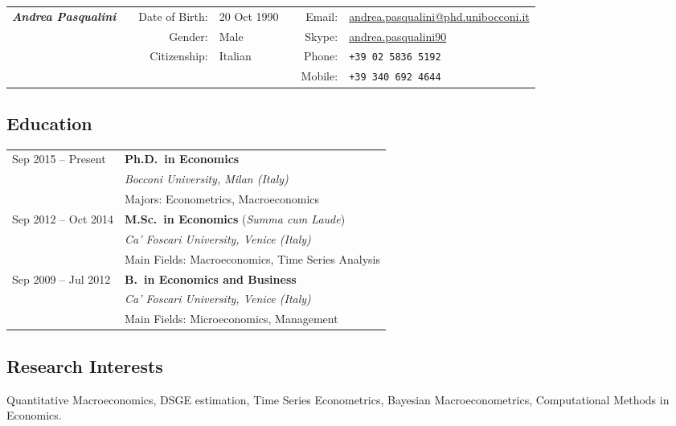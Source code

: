\documentclass[a4paper,10pt]{article}
\makeatletter
\newlength{\leftcolumn}
\newlength{\maincolumn}
\newcommand{\email}{{\href{mailto:andrea.pasqualini@phd.unibocconi.it}{andrea.pasqualini@phd.unibocconi.it}}}
\newcommand{\skype}{{\href{skype:andrea.pasqualini90}{andrea.pasqualini90}}}
\newcommand{\phone}{\tt +39~02~5836~5192}
\newcommand{\mobile}{\tt +39~340~692~4644}
\newcommand{\cafoscari}{\emph{Ca' Foscari University, Venice (Italy)}}
\newcommand{\bocconi}{\emph{Bocconi University, Milan (Italy)}}
\makeatother
\begin{document}
	{\hspace{-2cm}
		\small
		\begin{tabular}{lcrlcrl}
			\multirow{4}{*}{\LARGE\itshape\bfseries Andrea Pasqualini}
			&& Date of Birth: 	& 20 Oct 1990 	&& Email: 	& \email 	\\ 
			&& Gender: 			& Male 			&& Skype:	& \skype 	\\ 
			&& Citizenship: 	& Italian 		&& Phone: 	& \phone 	\\
			&& 					& 				&& Mobile: 	& \mobile \\ \hline
		\end{tabular}
	}

	\subsection*{Education}
		\begin{longtable}{p{\leftcolumn}p{\maincolumn}}
			Sep 2015 -- Present 	& \textbf{Ph.D.~in Economics} \\
									& \bocconi \\
									& Majors: Econometrics, Macroeconomics \vspace{1em}\\
			Sep 2012 -- Oct 2014 	& \textbf{M.Sc.~in Economics} (\emph{Summa cum Laude}) \\
									& \cafoscari \\
									& Main Fields: Macroeconomics, Time Series Analysis \vspace{1em}\\
			Sep 2009 -- Jul 2012 	& \textbf{B.~in Economics and Business} \\
									& \cafoscari \\
		 							& Main Fields: Microeconomics, Management \vspace{1em}
		\end{longtable}

	\subsection*{Research Interests}
		Quantitative Macroeconomics, DSGE estimation, Time Series Econometrics, Bayesian Macroeconometrics, Computational Methods in Economics.

		
		\vspace{2em}
\end{document}

